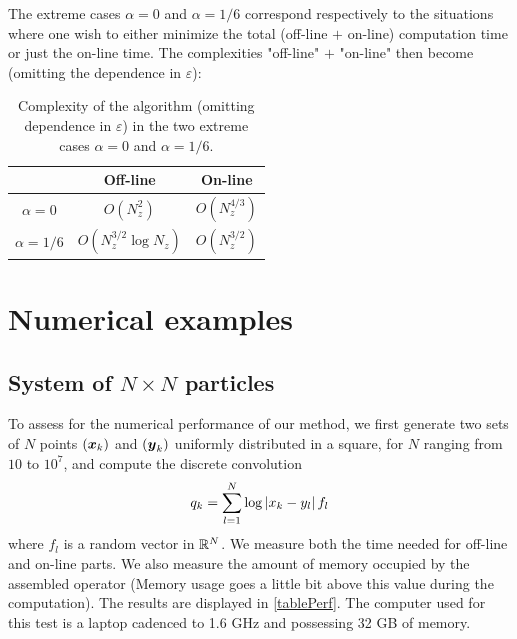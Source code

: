 \documentclass[smallextended]{svjour3}
\begin{document}
\begin{remark}
	The extreme cases $\alpha= 0$ and $\alpha = 1/6$ correspond respectively to the situations where one wish to either minimize the total (off-line $+$ on-line) computation time or just the on-line time. The complexities "off-line" $+$ "on-line" then become (omitting the dependence in $\varepsilon$):	
	\begin{table}[H]
		\centering
		\begin{tabular}{ |c|c|c| } 
			\hline
			               & Off-line                          & On-line        \\ 
			\hline
			$\alpha = 0$   & $O(N_z^2)$                        & $O(N_z^{4/3})$ \\ 
			$\alpha = 1/6$ & $O\left(N_z^{3/2}\log N_z\right)$ & $O(N_z^{3/2})$ \\ 
			\hline
		\end{tabular}
		\caption{Complexity of the algorithm (omitting dependence in $\varepsilon$) in the two extreme cases $\alpha=0$ and $\alpha = 1/6$.}
	\end{table}									
\end{remark}
																																																		
\section{Numerical examples}
																																																		
\subsection{System of $N\times N$ particles}
																												
To assess for the numerical performance of our method, we first generate two sets of $N$ points $(\boldsymbol{x}_k)$ and $(\boldsymbol{y}_k)$ uniformly distributed in a square, for $N$ ranging from $10$ to $10^7$, and compute the discrete convolution  
\[ q_k = \sum_{l=1}^N \log\left\lvert x_k - y_l \right\rvert f_l\]
where $f_l$ is a random vector in $\mathbb{R}^{N}$.
We measure both the time needed for off-line and on-line parts. We also measure the amount of memory occupied by the assembled operator (Memory usage goes a little bit above this value during the computation). The results are displayed in \autoref{tablePerf}. The computer used for this test is a laptop cadenced to 1.6 GHz and possessing 32 GB of memory. 
																																																		
\end{document}
